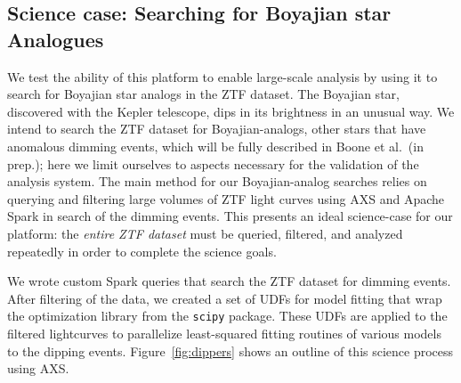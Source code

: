\documentclass[twocolumn, linenumbers]{aastex631}
\begin{document}
\subsection{Science case: Searching for Boyajian star Analogues}
\label{sec:ztf_science}
We test the ability of this platform to enable large-scale analysis by using it to search for Boyajian star \citep{boyajian} analogs in the ZTF dataset. The Boyajian star, discovered with the Kepler telescope, dips in its brightness in an unusual way. We intend to search the ZTF dataset for Boyajian-analogs, other stars that have anomalous dimming events, which will be fully described in Boone et al.~(in prep.); here we limit ourselves to aspects necessary for the validation of the analysis system. The main method for our Boyajian-analog searches relies on querying and filtering large volumes of ZTF light curves using AXS and Apache Spark in search of the dimming events. This presents an ideal science-case for our platform: the \textit{entire ZTF dataset} must be queried, filtered, and analyzed repeatedly in order to complete the science goals. 

We wrote custom Spark queries that search the ZTF dataset for dimming events. After filtering of the data, we created a set of UDFs for model fitting that wrap the optimization library from the \texttt{scipy} package. These UDFs are applied to the filtered lightcurves to parallelize least-squared fitting routines of various models to the dipping events. Figure~\ref{fig:dippers} shows an outline of this science process using AXS.
\end{document}
